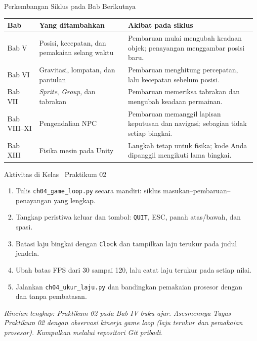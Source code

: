 \documentclass[aspectratio=169,10pt]{beamer}
\begin{document}
\begin{frame}{Perkembangan Siklus pada Bab Berikutnya}
{\scriptsize
\renewcommand{\arraystretch}{1.14}
\begin{tabularx}{\textwidth}{@{}>{\centering\arraybackslash}p{1.9cm}
    >{\raggedright\arraybackslash}p{5.2cm}
    >{\raggedright\arraybackslash}X@{}}
\toprule
\textbf{Bab} & \textbf{Yang ditambahkan} & \textbf{Akibat pada siklus} \\
\midrule
Bab V & Posisi, kecepatan, dan pemakaian selang waktu &
  Pembaruan mulai mengubah keadaan objek; penayangan menggambar posisi baru. \\
Bab VI & Gravitasi, lompatan, dan pantulan &
  Pembaruan menghitung percepatan, lalu kecepatan sebelum posisi. \\
Bab VII & \emph{Sprite}, \emph{Group}, dan tabrakan &
  Pembaruan memeriksa tabrakan dan mengubah keadaan permainan. \\
Bab VIII--XI & Pengendalian NPC &
  Pembaruan memanggil lapisan keputusan dan navigasi; sebagian tidak setiap
  bingkai. \\
Bab XIII & Fisika mesin pada Unity &
  Langkah tetap untuk fisika; kode Anda dipanggil mengikuti lama bingkai. \\
\bottomrule
\end{tabularx}}
\end{frame}

\begin{frame}{Aktivitas di Kelas \textperiodcentered\ Praktikum 02}
\begin{enumerate}
  \item Tulis \texttt{ch04\_game\_loop.py} secara mandiri: siklus
        masukan--pembaruan--penayangan yang lengkap.
  \item Tangkap peristiwa keluar dan tombol: \texttt{QUIT}, ESC, panah
        atas/bawah, dan spasi.
  \item Batasi laju bingkai dengan \texttt{Clock} dan tampilkan laju terukur
        pada judul jendela.
  \item Ubah batas FPS dari 30 sampai 120, lalu catat laju terukur pada setiap
        nilai.
  \item Jalankan \texttt{ch04\_ukur\_laju.py} dan bandingkan pemakaian prosesor
        dengan dan tanpa pembatasan.
\end{enumerate}
\vspace{0.12cm}
{\footnotesize\color{ubAccent}\itshape Rincian lengkap: Praktikum 02 pada
Bab IV buku ajar. Asesmennya Tugas Praktikum 02 dengan observasi kinerja
\emph{game loop} (laju terukur dan pemakaian prosesor). Kumpulkan melalui
repositori Git pribadi.}
\end{frame}
\end{document}
